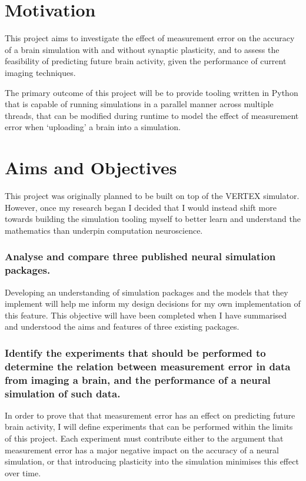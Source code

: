 \section{Motivation}

This project aims to investigate the effect of measurement error on the accuracy
of a brain simulation with and without synaptic plasticity, and to assess the
feasibility of predicting future brain activity, given the performance of
current imaging techniques.

The primary outcome of this project will be to provide tooling written in Python
that is capable of running simulations in a parallel manner across multiple
threads, that can be modified during runtime to model the effect of measurement
error when `uploading' a brain into a simulation.

\pagebreak

\section{Aims and Objectives}

This project was originally planned to be built on top of the VERTEX simulator.
However, once my research began I decided that I would instead shift more
towards building the simulation tooling myself to better learn and understand
the mathematics than underpin computation neuroscience.

\subsubsection{Analyse and compare three published neural simulation packages.}

Developing an understanding of simulation packages and the models that they
implement will help me inform my design decisions for my own implementation of
this feature. This objective will have been completed when I have summarised and
understood the aims and features of three existing packages.


\subsubsection{Identify the experiments that should be performed to determine
      the relation between measurement error in data from imaging a brain, and the
      performance of a neural simulation of such data.}

In order to prove that that
measurement error has an effect on predicting future brain activity, I will
define experiments that can be performed within the limits of this project. Each
experiment must contribute either to the argument that measurement error has a
major negative impact on the accuracy of a neural simulation, or that
introducing plasticity into the simulation minimises this effect over time.


